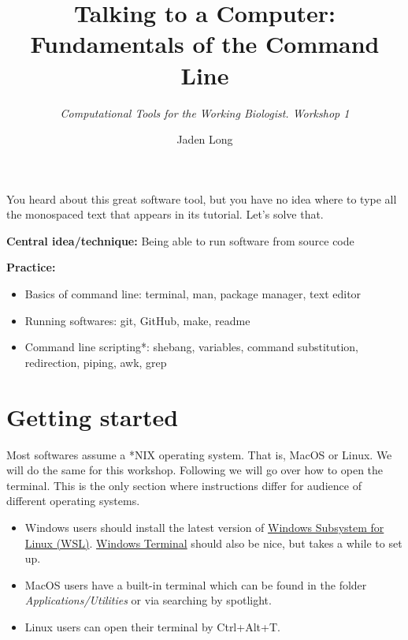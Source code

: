 \documentclass[12pt,letterpaper]{article}
\title{\textbf{Talking to a Computer: Fundamentals of the Command Line}}
\author{\textit{Computational Tools for the Working Biologist. Workshop 1}}
\date{Jaden Long}
\begin{document}
\maketitle
\thispagestyle{empty}

\vspace{1em}

\noindent
You heard about this great software tool, but you have no idea where to type all the monospaced text that appears in its tutorial. Let's solve that.

\noindent
\textbf{Central idea/technique:} Being able to run software from source code

\textbf{Practice:}

\begin{itemize}
   \item Basics of command line: terminal, man, package manager, text editor
   \item Running softwares: git, GitHub, make, readme
   \item Command line scripting*: shebang, variables, command substitution, redirection, piping, awk, grep
\end{itemize}

\section{Getting started}


Most softwares assume a *NIX operating system. That is, MacOS or Linux. We will do the same for this workshop. Following we will go over how to open the terminal. This is the only section where instructions differ for audience of different operating systems.

\begin{itemize}
   \item Windows users should install the latest version of \href{https://learn.microsoft.com/en-us/windows/wsl/install}{Windows Subsystem for Linux (WSL)}. \href{https://apps.microsoft.com/detail/9N0DX20HK701?hl=en-US&gl=US}{Windows Terminal} should also be nice, but takes a while to set up.
   \item MacOS users have a built-in terminal which can be found in the folder \textit{Applications/Utilities} or via searching by spotlight.
   \item Linux users can open their terminal by Ctrl+Alt+T.
\end{itemize}
\end{document}
